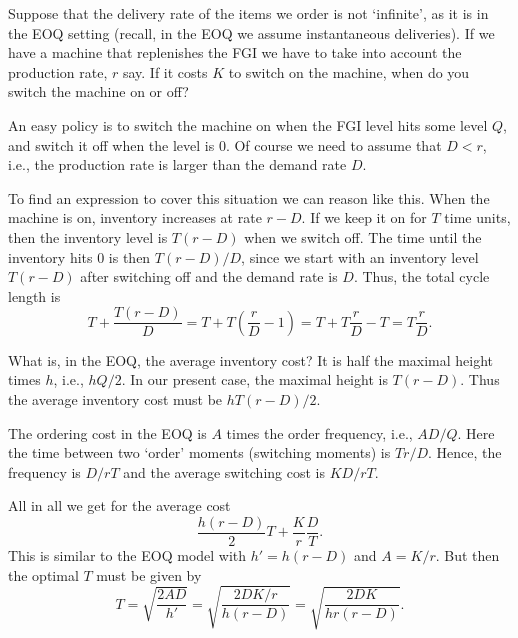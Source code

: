 \begin{question}
  Suppose that the delivery rate of the items we order is not
  `infinite', as it is in the EOQ setting (recall, in the EOQ we
  assume instantaneous deliveries). If we have a machine that
  replenishes the FGI we have to take into account the production
  rate, $r$ say. If it costs $K$ to switch on the machine, when do you switch the machine on or off?
  \begin{solution}
    An easy policy is to switch the machine on when the FGI level hits
    some level $Q$, and switch it off when the level is $0$. Of course
    we need to assume that $D<r$, i.e., the production rate is larger
    than the demand rate $D$. 

    To find an expression to cover this situation we can reason like
    this.  When the machine is on, inventory increases at rate
    $r-D$. If we keep it on for $T$ time units, then the inventory
    level is $T(r-D)$ when we switch off. The time until the inventory
    hits 0 is then $T(r-D)/D$, since we start with an inventory level
    $T(r-D)$ after switching off and the demand rate is $D$. Thus, the total cycle length is
    \begin{equation*}
      T + \frac{T(r-D)}D = T + T(\frac{r}D-1) = T + T\frac r D - T = T\frac r D.
    \end{equation*}

    What is, in the EOQ, the average inventory cost? It is half the
    maximal height times $h$, i.e., $hQ/2$. In our present case, the
    maximal height is $T(r-D)$. Thus the average inventory cost must
    be  $hT(r-D)/2$. 

    The ordering cost in the EOQ is $A$ times the order frequency, i.e., $A D/Q$. Here the time between two `order' moments (switching moments) is $Tr/D$. Hence, the frequency is $D/rT$ and the average switching cost is $K D/rT$. 

All in all we get for the average cost
\begin{equation*}
  \frac{h(r-D)}2 T + \frac{K}r \frac DT.
\end{equation*}
This is similar to the EOQ model with $h'=h(r-D)$ and $A=K/r$. But then the optimal $T$ must be given by
\begin{equation*}
  T = \sqrt{\frac{2AD}{h'}} = \sqrt{\frac{2DK/r}{h(r-D)}}=\sqrt{\frac{2DK}{hr(r-D)}}.
\end{equation*}
  \end{solution}
\end{question}


